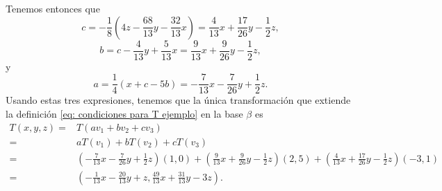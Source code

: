 Tenemos entonces que
\begin{equation}
	\label{eq: ejemplo c}
	c = -\frac{1}{8} \left( 4z - \frac{68}{13} y
- \frac{32}{13} x \right) = 
\frac{4}{13} x + \frac{17}{26} y - \frac{1}{2} z,
\end{equation}
\begin{equation}
	\label{eq: ejemplo b}
	b = c - \frac{4}{13} y + \frac{5}{13} x =
\frac{9}{13} x + \frac{9}{26} y - \frac{1}{2} z,
\end{equation}
y
\begin{equation}
	\label{eq: ejemplo a}
	a = \frac{1}{4} \left( x+c-5b \right)
= -\frac{7}{13} x - \frac{7}{26} y + \frac{1}{2} z.
\end{equation}
Usando estas tres expresiones, tenemos que
la única transformación que extiende la definición 
\eqref{eq: condiciones para T ejemplo}
en la base $\beta$ es
\begin{align*}
T(x, y, z) = & 
T \left( a v_{1} + bv_{2} + cv_{3} \right) \\
= & a T(v_{1}) + b T(v_{2}) + c T(v_{3}) \\
= & \left( -\frac{7}{13} x - \frac{7}{26} y + \frac{1}{2} z \right)
(1, 0) + 
\left( \frac{9}{13} x + \frac{9}{26} y - \frac{1}{2} z \right)
(2, 5) + 
\left( \frac{4}{13} x + \frac{17}{26} y - \frac{1}{2} z \right)
(-3, 1) \\
= & \left( -\frac{1}{13} x - \frac{20}{13} y + z,
\frac{49}{13}x + \frac{31}{13} y - 3z \right).
\end{align*}
